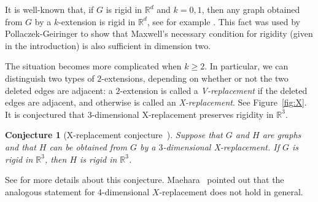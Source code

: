 \documentclass{daj}
\newtheorem{conjecture}[thm]{Conjecture}\theoremstyle{plain}
\newcommand{\R}{\mathbb{R}}
\begin{document}
It is well-known that,
if $G$ is rigid in $\R^d$ and $k=0,1$, then any graph obtained from $G$ by a $k$-extension is rigid  in $\R^d$, see for example \cite{Wsurvey}.
This fact was used by Pollaczek-Geiringer \cite{P-G} to show that Maxwell's necessary condition for rigidity (given in the introduction) is also sufficient in dimension two.
%

 The situation becomes more complicated when $k\geq 2$.
In particular, we can distinguish two types of $2$-extensions, depending on whether or not the two deleted edges are adjacent:
a $2$-extension is called a {\em V-replacement} if the deleted edges are adjacent,
and otherwise is called an {\em X-replacement}. See Figure~\ref{fig:X}.
It is conjectured that 3-dimensional X-replacement preserves rigidity in $\R^3$.

\begin{conjecture}[X-replacement conjecture~\cite{TW85}]
Suppose that $G$ and $H$ are graphs and that $H$ can be obtained from $G$ by a $3$-dimensional X-replacement.
If $G$ is rigid in $\R^3$, then $H$ is rigid in $\R^3$.
\end{conjecture}
\noindent
See \cite{C14} for more details about this conjecture.
Maehara~\cite{M91} pointed out that the  analogous statement for 4-dimensional $X$-replacement does not hold in general.
\end{document}
